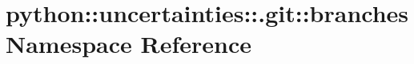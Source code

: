 \hypertarget{namespacepython_1_1uncertainties_1_1_8git_1_1branches}{
\section{python::uncertainties::.git::branches Namespace Reference}
\label{namespacepython_1_1uncertainties_1_1_8git_1_1branches}
}
